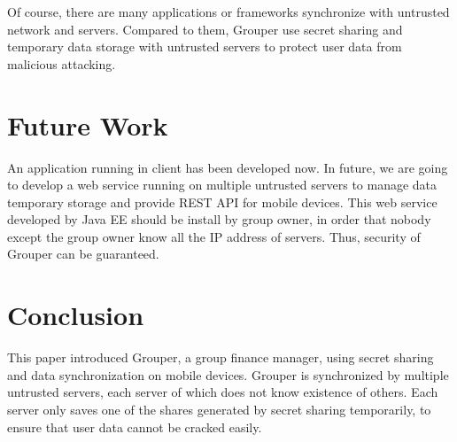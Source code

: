 \documentclass[twocolumn,10pt]{article}
\begin{document}
Of course, there are many applications or frameworks synchronize with untrusted network and servers. Compared to them, Grouper use secret sharing and temporary data storage with untrusted servers to protect user data from malicious attacking.

\section{Future Work}

An application running in client has been developed now. In future, we are going to develop a web service running on multiple untrusted servers to manage data temporary storage and provide REST API for mobile devices. This web service developed by Java EE should be install by group owner, in order that nobody except the group owner know all the IP address of servers. Thus, security of Grouper can be guaranteed.

\section{Conclusion}

This paper introduced Grouper, a group finance manager, using secret sharing and data synchronization on mobile devices. Grouper is synchronized by multiple untrusted servers, each server of which does not know existence of others. Each server only saves one of the shares generated by secret sharing temporarily, to ensure that user data cannot be cracked easily.

{\tiny
\printbibliography
}
\end{document}
